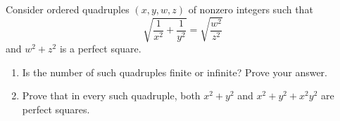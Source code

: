 Consider ordered quadruples $(x,y,w,z)$ of nonzero integers such that
\[\sqrt{\dfrac{1}{x^2}+\dfrac{1}{y^2}}=\sqrt{\dfrac{w^2}{z^2}}\]
and $w^2+z^2$ is a perfect square.
\begin{enumerate}
\item[(a)] Is the number of such quadruples finite or infinite? Prove your answer.
\item[(b)] Prove that in every such quadruple, both $x^2+y^2$ and $x^2+y^2+x^2y^2$ are perfect squares.
\end{enumerate}
